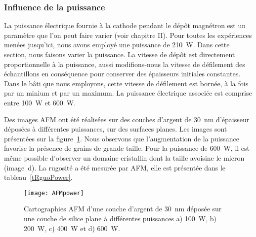 	\subsubsection{Influence de la puissance}
La puissance électrique fournie à la cathode pendant le dépôt magnétron est un paramètre que l'on peut faire varier (voir chapitre II). Pour toutes les expériences menées jusqu'ici, nous avons employé une puissance de 210~W. Dans cette section, nous faisons varier la puissance. La vitesse de dépôt est directement proportionnelle à la puissance, aussi modifions-nous la vitesse de défilement des échantillons en conséquence pour conserver des épaisseurs initiales constantes. Dans le bâti que nous employons, cette vitesse de défilement est bornée, à la fois par un minium et par un maximum. La puissance électrique associée est comprise entre 100~W et 600~W.\par 
Des images AFM ont été réalisées sur des couches d'argent de 30~nm d'épaisseur déposées à différentes puissances, sur des surfaces planes. Les images sont présentées sur la figure~\ref{AFMpower}. Nous observons que l'augmentation de la puissance favorise la présence de grains de grande taille. Pour la puissance de 600~W, il est même possible d'observer un domaine cristallin dont la taille avoisine le micron (image~d). La rugosité a été mesurée par AFM, elle est présentée dans le tableau~\ref{tRguoPower}.\par 
\begin{figure}[!htb]
\centering
\texttt{[image: AFMpower]}
\caption{Cartographies AFM d'une couche d'argent de 30~nm déposée sur une couche de silice plane à différentes puissances a) 100~W, b) 200~W, c) 400~W et d) 600~W.}
\label{AFMpower}
\end{figure}

